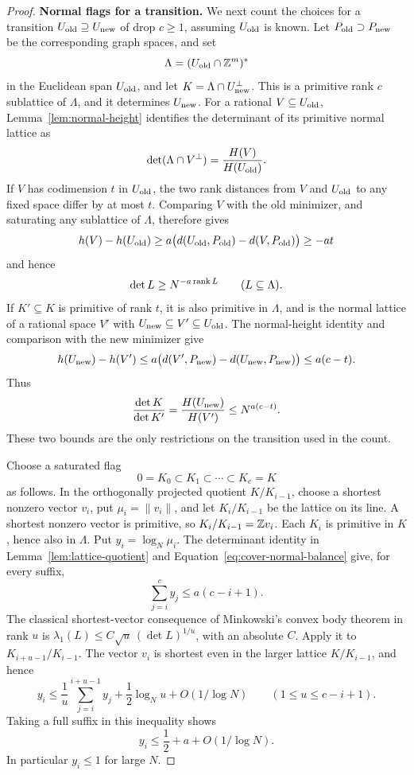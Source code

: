 \begin{proof}
\medskip\noindent\textbf{Normal flags for a transition.}
We next count the choices for a transition \(U_{\rm old}\supseteq
U_{\rm new}\) of drop \(c\ge1\), assuming \(U_{\rm old}\) is known.
Let \(P_{\rm old}\supset P_{\rm new}\) be the corresponding graph
spaces, and set
\[
 \Lambda=(U_{\rm old}\cap\mathbb Z^m)^*
\]
in the Euclidean span \(U_{\rm old}\), and let
\(K=\Lambda\cap U_{\rm new}^{\perp}\). This is a primitive rank \(c\)
sublattice of \(\Lambda\), and it determines \(U_{\rm new}\).
For a rational \(V\subseteq U_{\rm old}\), Lemma~\ref{lem:normal-height}
identifies the determinant of its primitive normal lattice as
\[
 \det(\Lambda\cap V^\perp)=\frac{H(V)}{H(U_{\rm old})}.
\]
If \(V\) has codimension \(t\) in \(U_{\rm old}\), the two rank
distances from \(V\) and \(U_{\rm old}\) to any fixed space differ by at
most \(t\). Comparing \(V\) with the old minimizer, and saturating any
sublattice of \(\Lambda\), therefore gives
\[
 h(V)-h(U_{\rm old})
 \ge a\bigl(d(U_{\rm old},P_{\rm old})-d(V,P_{\rm old})\bigr)
 \ge-at
\]
and hence
\[
 \det L\ge N^{-a\operatorname{rank} L}\qquad(L\subseteq\Lambda).
\]
If \(K'\subseteq K\) is primitive of rank \(t\), it is also primitive
in \(\Lambda\), and is the normal lattice of a rational space
\(V'\) with \(U_{\rm new}\subseteq V'\subseteq U_{\rm old}\).
The normal-height identity and comparison with the new minimizer give
\[
 h(U_{\rm new})-h(V')
 \le a\bigl(d(V',P_{\rm new})-d(U_{\rm new},P_{\rm new})\bigr)
 \le a(c-t).
\]
Thus
\begin{equation}\label{eq:cover-normal-balance}
 \frac{\det K}{\det K'}
 =\frac{H(U_{\rm new})}{H(V')}
 \le N^{a(c-t)}.
\end{equation}
These two bounds are the only restrictions on the transition used in
the count.

Choose a saturated flag
\[
 0=K_0\subset K_1\subset\cdots\subset K_c=K
\]
as follows. In the orthogonally projected quotient \(K/K_{i-1}\),
choose a shortest nonzero vector \(v_i\), put \(\mu_i=\|v_i\|\), and
let \(K_i/K_{i-1}\) be the lattice on its line. A shortest nonzero
vector is primitive, so \(K_i/K_{i-1}=\mathbb Z v_i\). Each \(K_i\) is
primitive in \(K\), hence also in \(\Lambda\). Put
\(y_i=\log_N\mu_i\). The determinant identity in
Lemma~\ref{lem:lattice-quotient} and Equation~\eqref{eq:cover-normal-balance}
give, for every suffix,
\begin{equation}\label{eq:cover-flag-suffix}
 \sum_{j=i}^c y_j\le a(c-i+1).
\end{equation}
The classical shortest-vector consequence of Minkowski's convex body
theorem in rank \(u\) is
\(\lambda_1(L)\le C\sqrt u\,(\det L)^{1/u}\), with an absolute \(C\).
Apply it to \(K_{i+u-1}/K_{i-1}\). The vector \(v_i\) is shortest even
in the larger lattice \(K/K_{i-1}\), and hence
\begin{equation}\label{eq:cover-flag-range}
 y_i\le \frac1u\sum_{j=i}^{i+u-1}y_j
       +\frac12\log_Nu+O(1/\log N)
 \qquad(1\le u\le c-i+1).
\end{equation}
Taking a full suffix in this inequality shows
\[
 y_i\le \frac12+a+O(1/\log N).
\]
In particular \(y_i\le1\) for large \(N\).


\end{proof}
